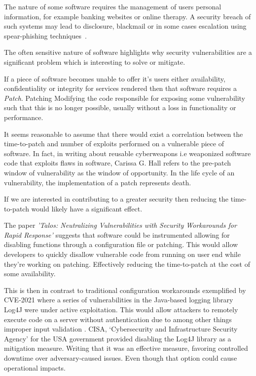 \documentclass[a4paper,11pt]{report}
\begin{document}
The nature of some software requires the management of users personal information, for example banking websites or online therapy. A security breach of such systems may lead to disclosure, blackmail  or in some cases escalation using spear-phishing techniques~\cite{XU2023103908,doi:10.10520/EJC-1b9220e55b}.

The often sensitive nature of software highlights why security vulnerabilities are a significant problem which is interesting to solve or mitigate.

If a piece of software becomes unable to offer it's users either availability, confidentiality or integrity for services rendered then that software requires a \textit{Patch}. Patching Modifying the code responsible for exposing some vulnerability such that this is no longer possible, usually without a loss in functionality or performance.

It seems reasonable to assume that there would exist a correlation between the time-to-patch and number of exploits performed on a vulnerable piece of software. In fact, in writing about reusable cyberweapons i.e weaponized software code that exploits flaws in software, Carissa G. Hall refers to the pre-patch window of vulnerability as the window of opportunity. In the life cycle of an vulnerability, the implementation of a patch represents death.~\cite{hall2017time}

If we are interested in contributing to a greater security then reducing the time-to-patch would likely have a significant effect.

The paper \textit{'Talos: Neutralizing Vulnerabilities with Security Workarounds for Rapid Response'} suggests that software could be instrumented allowing for disabling functions through a configuration file or patching. This would allow developers to quickly disallow vulnerable code from running on user end while they're working on patching. Effectively reducing the time-to-patch at the cost of some availability.

This is then in contrast to traditional configuration workarounds exemplified by CVE-2021 where a series of vulnerabilities in the Java-based logging library Log4J were under active exploitation. This would allow attackers to remotely execute code on a server without authentication due to among other things improper input validation \cite{ed-22-02}. CISA, `Cybersecurity and Infrastructure Security Agency' for the USA government provided disabling the Log4J library as a mitigation measure. Writing that it was an effective measure, favoring controlled downtime over adversary-caused issues. Even though that option could cause operational impacts. \cite{ed-22-02-rmm}
\end{document}
